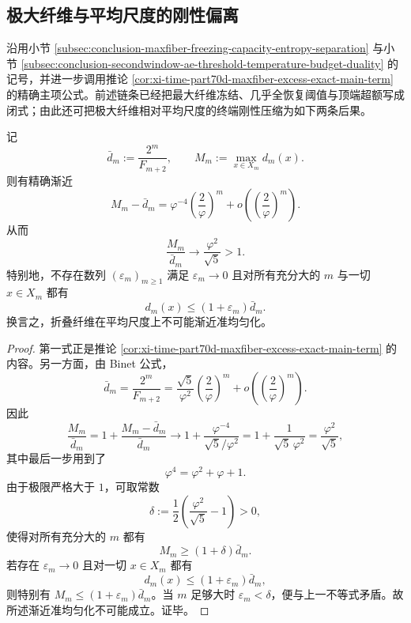 \subsection{极大纤维与平均尺度的刚性偏离}\label{subsec:conclusion-maxfiber-average-scale-rigidity}
沿用小节 \ref{subsec:conclusion-maxfiber-freezing-capacity-entropy-separation} 与小节 \ref{subsec:conclusion-secondwindow-ae-threshold-temperature-budget-duality} 的记号，并进一步调用推论 \ref{cor:xi-time-part70d-maxfiber-excess-exact-main-term} 的精确主项公式。前述链条已经把最大纤维冻结、几乎全恢复阈值与顶端超额写成闭式；由此还可把极大纤维相对平均尺度的终端刚性压缩为如下两条后果。

\begin{theorem}[极大纤维相对平均尺度的刚性超额]\label{thm:conclusion-maxfiber-average-scale-rigidity}
记
\[
\bar d_m:=\frac{2^m}{F_{m+2}},
\qquad
M_m:=\max_{x\in X_m}d_m(x).
\]
则有精确渐近
\[
\boxed{\;
M_m-\bar d_m
=
\varphi^{-4}\left(\frac{2}{\varphi}\right)^m
+o\!\left(\left(\frac{2}{\varphi}\right)^m\right).\;}
\]
从而
\[
\boxed{\;
\frac{M_m}{\bar d_m}\longrightarrow \frac{\varphi^2}{\sqrt5}>1.\;}
\]
特别地，不存在数列 \((\varepsilon_m)_{m\ge 1}\) 满足 \(\varepsilon_m\to 0\) 且对所有充分大的 \(m\) 与一切 \(x\in X_m\) 都有
\[
d_m(x)\le (1+\varepsilon_m)\bar d_m.
\]
换言之，折叠纤维在平均尺度上不可能渐近准均匀化。
\end{theorem}
\begin{proof}
第一式正是推论 \ref{cor:xi-time-part70d-maxfiber-excess-exact-main-term} 的内容。另一方面，由 Binet 公式，
\[
\bar d_m
=
\frac{2^m}{F_{m+2}}
=
\frac{\sqrt5}{\varphi^2}\left(\frac{2}{\varphi}\right)^m
+o\!\left(\left(\frac{2}{\varphi}\right)^m\right).
\]
因此
\[
\frac{M_m}{\bar d_m}
=
1+\frac{M_m-\bar d_m}{\bar d_m}
\longrightarrow
1+\frac{\varphi^{-4}}{\sqrt5/\varphi^2}
=
1+\frac{1}{\sqrt5\,\varphi^2}
=
\frac{\varphi^2}{\sqrt5},
\]
其中最后一步用到了
\[
\varphi^4=\varphi^2+\varphi+1.
\]
由于极限严格大于 \(1\)，可取常数
\[
\delta:=\frac12\left(\frac{\varphi^2}{\sqrt5}-1\right)>0,
\]
使得对所有充分大的 \(m\) 都有
\[
M_m\ge (1+\delta)\bar d_m.
\]
若存在 \(\varepsilon_m\to 0\) 且对一切 \(x\in X_m\) 都有
\[
d_m(x)\le (1+\varepsilon_m)\bar d_m,
\]
则特别有 \(M_m\le (1+\varepsilon_m)\bar d_m\)。当 \(m\) 足够大时 \(\varepsilon_m<\delta\)，便与上一不等式矛盾。故所述渐近准均匀化不可能成立。证毕。
\end{proof}

